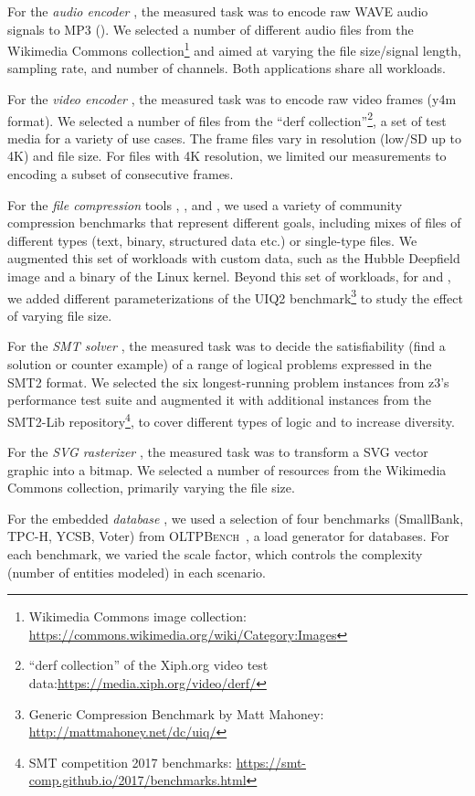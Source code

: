 {{For the \textit{audio encoder} \jumper, the measured task was to encode raw WAVE audio signals to MP3 (\jumper). We selected a number of different audio files from the Wikimedia Commons collection\footnote{Wikimedia Commons image collection: \url{https://commons.wikimedia.org/wiki/Category:Images}} and aimed at varying the file size/signal length, sampling rate, and number of channels. Both applications share all workloads.

For the \textit{video encoder} \xzwo, the measured task was to encode raw video frames (y4m format). We selected a number of files from the “derf collection”\footnote{``derf collection'' of the Xiph.org video test data:\url{https://media.xiph.org/video/derf/}}, a set of test media for a variety of use cases. The frame files vary in resolution (low/SD up to 4K) and file size. For files with 4K resolution, we limited our measurements to encoding a subset of consecutive frames.

For the \textit{file compression} tools \kanzi, \xz, and \lrzip, we used a variety of community compression benchmarks that represent different goals, including mixes of files of different types (text, binary, structured data etc.) or single-type files. We augmented this set of workloads with custom data, such as the Hubble Deepfield image and a binary of the Linux kernel. Beyond this set of workloads, for \xz and \lrzip, we added different parameterizations of the UIQ2 benchmark\footnote{Generic Compression Benchmark by Matt Mahoney: \url{http://mattmahoney.net/dc/uiq/}} to study the effect of varying file size. 

For the \textit{SMT solver} \zdrei, the measured task was to decide the satisfiability (find a solution or counter example) of a range of logical problems expressed in the SMT2 format. We selected the six longest-running problem instances from z3’s performance test suite and augmented it with additional instances from the SMT2-Lib repository\footnote{SMT competition 2017 benchmarks: \url{https://smt-comp.github.io/2017/benchmarks.html}}, to cover different types of logic and to increase diversity.

For the \textit{SVG rasterizer} \batik, the measured task was to transform a SVG vector graphic into a bitmap. We selected a number of resources from the Wikimedia Commons collection, primarily varying the file size. 

For the embedded \textit{database} \htwo, we used a selection of four benchmarks (SmallBank, TPC-H, YCSB, Voter) from \textsc{OLTPBench}~\cite{difallah_oltp_2013}, a load generator for databases. For each benchmark, we varied the scale factor, which controls the complexity (number of entities modeled) in each scenario.

}}
